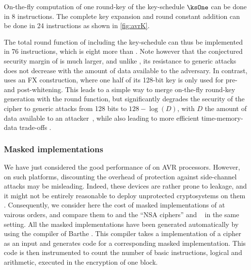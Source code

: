 On-the-fly computation of one round-key of the key-schedule $\ksOne$ can be done in 8 instructions. The complete key expansion and round constant addition can be done in 24 instructions
as shown in \autoref{fig:avrK}.

The total round function of \fly including the key-schedule can thus be implemented in 76 instructions, which is eight more than \pride. Note however that the conjectured security
margin of \fly is much larger, and unlike \pride, its resistance to generic attacks does not decrease with the amount of data available to the adversary. In contrast,
\pride uses an FX construction,
where one half of its 128-bit key is only used for pre- and post-whitening. This
leads to a simple way to merge on-the-fly round-key generation with the round function, but significantly degrades the security of the cipher to generic attacks
from 128 bits to $128 - \log(D)$, with $D$ the amount of data available to an attacker~\cite{desx}, while also leading to more efficient time-memory-data trade-offs \cite{itaitmd}.

\subsubsection{Masked implementations}
We have just considered the good performance of \fly on AVR processors.
However, on such platforms, discounting the overhead of protection
against side-channel attacks may be misleading.
Indeed, these devices are rather prone to leakage, and it might not be
entirely reasonable to deploy unprotected cryptosystems on them \cite{avrleak}.
Consequently, we consider here the cost of masked implementations of \fly at vairous orders,
and compare them to \pride and the ``NSA ciphers'' \simon and \speck~\cite{NSAciph} in the same setting.
All the masked implementations have been generated automatically by
using the compiler of Barthe \etal{} \cite{maskingcomp}.
This compiler takes a \C implementation of a cipher as an input and generates \C code for a corresponding masked implementation. This code is then instrumented to count the number of basic instructions,
\eg{} logical and arithmetic, executed in the encryption of one block.

